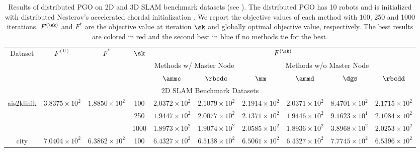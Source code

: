 \begin{table*}[t]
	\renewcommand{\arraystretch}{1.22}
		\setlength{\tabcolsep}{0.25em}
	\centering
	\caption{Results of distributed PGO on 2D and 3D SLAM benchmark datasets (see \datasetinfo). The distributed PGO has 10 robots  and is initialized with distributed Nesterov's accelerated chordal initialization \cite{fan2020mm}. We report the objective values of each method with 100, 250 and 1000 iterations. $F^{(\sk)}$ and $F^*$ are the objective value at iteration $\sk$ and globally optimal objective value, respectively. The best results are colored in {\color{red}red} and the second best in {\color{blue}blue} if no methods tie for the best.}	\label{table::comp}
	\begin{tabular}{|c||c|c||c|c|c||c|c|c|c|}
		\hline
		\multirow{3}{*}{Dataset}&\multirow{3}{*}{$F^{(0)}$} &\multirow{3}{*}{$F^{*}$} &\multirow{3}{*}{\;$\sk$\;}& \multicolumn{6}{c|}{$F^{(\sk)}$}\\
		\cline{5-10}
		& & & & \multicolumn{2}{c||}{Methods w/ Master Node} & \multicolumn{4}{c|}{Methods w/o Master Node}\\
		\cline{5-10}
		& & & & \;$\ammc$\;  & $\rbcdc$ \cite{tian2019distributed} & $\;\;\;\mm\;\;\;$  & \;$\ammd$\;  & $\;\;\;\dgs$ \cite{choudhary2017distributed} $\;$ & {$\rbcdd$ \cite{tian2019distributed}}  \\
		\hline
    \multicolumn{10}{|c|}{{2D SLAM Benchmark Datasets}}\\
		\hline
		\multirow{3}{*}{\sf ais2klinik} &\multirow{3}{*}{$3.8375\times 10^2$} &\multirow{3}{*}{$1.8850\times 10^2$}
    &100 & {\color{blue}$2.0372\times 10^{2}$} &$2.1079\times 10^{2}$ & $2.1914\times 10^{2}$ & {\color{red}$2.0371\times 10^{2}$} & $8.4701\times 10^{2}$ & $2.1715\times 10^{2}$  \\
		\cline{4-10}
		& &
    &250 & {\color{blue}$1.9447\times 10^{2}$} &$2.0077\times 10^{2}$ & $2.1371\times 10^{2}$ & {\color{red}$1.9446\times 10^{2}$} & $9.1623\times 10^{1}$ & $2.1084\times 10^{2}$  \\
		\cline{4-10}
		& &
    &1000& {\color{blue}$1.8973\times 10^{2}$} &$1.9074\times 10^{2}$ & $2.0585\times 10^{2}$ & {\color{red}$1.8936\times 10^{2}$} & $3.8968\times 10^{2}$ & $2.0253\times 10^{2}$  \\
		\hline
    \multirow{3}{*}{\sf city} &\multirow{3}{*}{$7.0404\times 10^2$} &\multirow{3}{*}{$6.3862\times 10^2$}
    &100 &\color{ao}$6.4327\times 10^2$ & $6.5138\times 10^2$ &$6.5061\times 10^2$ &\color{ao}$6.4327\times10^{2}$ &$7.7745\times10^{2}$ & $6.5396\times 10^2$ \\

\end{tabular}
\end{table*}
